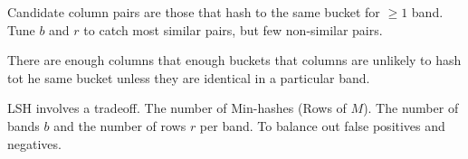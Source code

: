         Candidate column pairs are those that hash to the same bucket for $\geq 1$ band. Tune $b$ and $r$ to catch most similar pairs, but few non-similar pairs. 
        
        There are enough columns that enough buckets that columns are unlikely to hash tot he same bucket unless they are identical in a particular band. 
        
        LSH involves a tradeoff. The number of Min-hashes (Rows of $M$). The number of bands $b$ and the number of rows $r$ per band. To balance out false positives and negatives. 